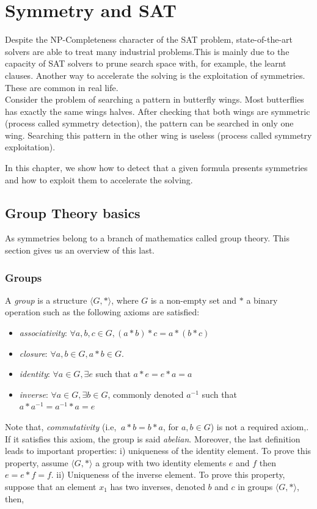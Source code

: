 \chapter{Symmetry and SAT}\label{chap:symmetryinsat}
\minitoc

Despite the NP-Completeness character of the SAT problem, state-of-the-art solvers are able to treat many industrial problems.This is mainly due to the capacity of SAT solvers to prune search space with, for example, the learnt clauses.
Another way to accelerate the solving is the exploitation of symmetries.
These are common in real life. \\
Consider the problem of searching a pattern in butterfly wings.
Most butterflies has exactly the same wings halves. After checking that both wings are symmetric
(process called symmetry detection), the pattern can be searched in only one wing. Searching this pattern in the other wing is useless (process called symmetry exploitation). 

In this chapter, we show how to detect that a given formula presents symmetries and how to
exploit them to accelerate the solving.





\section{Group Theory basics}	
As symmetries belong to a branch of mathematics called group theory.
This section gives us an overview of this last.

\subsection{Groups}
A \emph{group} is a structure $\langle G, * \rangle$, where $G$ is a non-empty set and $*$ a binary
operation such as the following axioms are satisfied:
\begin{itemize}[noitemsep,nolistsep]
 \item \emph{associativity}: $\forall a, b, c \in G, (a * b) * c = a * (b * c)$
 \item \emph{closure}: $\forall a, b \in G, a * b \in G$.
 \item \emph{identity}: $\forall a \in G, \exists e$ such that $ a * e = e * a = a$
 \item \emph{inverse}:  $\forall a \in G, \exists b \in G$, commonly denoted $a^{-1}$ such that
 $a * a^{-1} = a^{-1} * a = e$
\end{itemize}
Note that, \emph{commutativity} (i.e, $\ a * b = b * a$, for $a, b \in G$) is not a required axiom,.
If it satisfies this axiom, the group is said \emph{abelian}.
Moreover, the last definition leads to important properties: i) uniqueness of the identity element. 
To prove this property, assume $\langle G, * \rangle$ a group with two identity elements $e$ and $f$ 
then $ e = e * f = f$.
ii) Uniqueness of the inverse element. To prove this property, suppose that an element $x_1$ has two inverses,
denoted $b$ and $c$ in groups $\langle G, * \rangle$, then,\\

